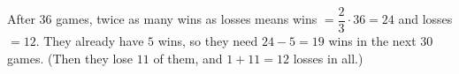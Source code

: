 After $36$ games, twice as many wins as losses means wins $=\dfrac{2}{3}\cdot36=24$ and losses $=12$. They already have $5$ wins, so they need $24-5=\boxed{19}$ wins in the next $30$ games. (Then they lose $11$ of them, and $1+11=12$ losses in all.)
